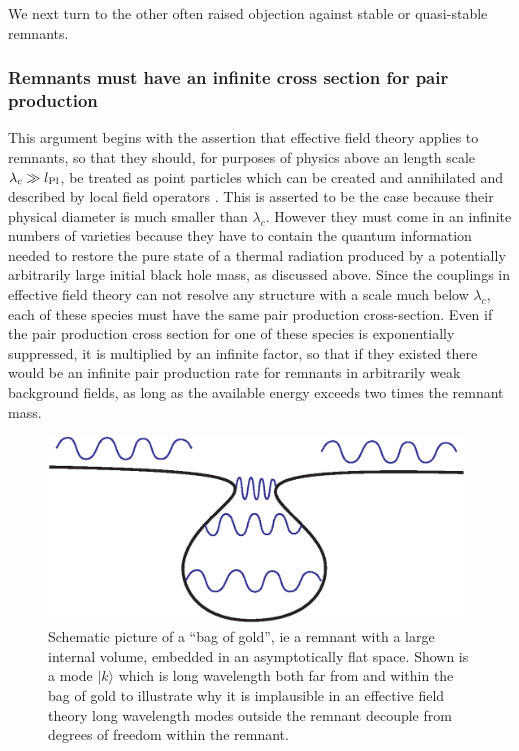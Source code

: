 \documentclass[12pt]{article}
\begin{document}
We next turn to the other often raised objection against stable or quasi-stable remnants.

\subsubsection*{Remnants must have an infinite cross section for pair production}

This argument begins with the assertion that effective field theory applies to remnants, so that they should, for purposes of physics above an length  scale $\lambda_c \gg l_{{\rm Pl}}$, be treated as point particles which can be created and annihilated and described by local field operators \cite{Giddings:1993vj,Giddings:1993km}. This is asserted to be the case because their physical diameter is much smaller
than $\lambda_c$.  However they must come in an infinite numbers of varieties because they have to contain the quantum information needed to restore the pure state of a thermal radiation produced by a potentially arbitrarily large initial black hole mass, as discussed above.  Since the couplings in effective field theory can not resolve any structure with a scale much below 
$\lambda_c$, each of these species must have the same pair production cross-section. Even if the pair production cross section for one of these species is exponentially suppressed, it is multiplied by an infinite factor, so that if they existed there would be an infinite pair production rate for remnants in arbitrarily weak background fields, as long as the available
energy exceeds two times the remnant mass.
\begin{figure}[ht]
\centering \includegraphics[width=11cm]{bog.eps}

\caption{Schematic picture of a ``bag of gold'', ie a remnant with a large internal volume, embedded in an asymptotically flat space.  
Shown is a mode $| k \rangle $ which is long wavelength
both far from 
and within the bag of gold to illustrate why it is implausible in an effective field theory long
wavelength modes outside the remnant decouple from degrees of freedom within the remnant. 
\label{bog}}
\end{figure}
\end{document}
